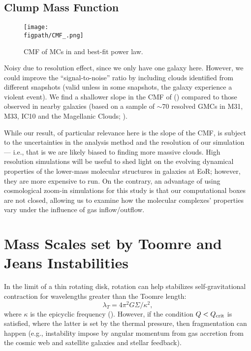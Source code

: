 \documentclass[apj]{emulateapj} %
\begin{document}
\subsection{Clump Mass Function}

\begin{figure*}[htbp]
\centering
\texttt{[image: \\figpath/CMF\_.png]}  
\caption{
CMF of MCs in \flower and best-fit power law.
\label{fig:cmf}}
\end{figure*}

Noisy due to resolution effect, since we only have one galaxy here. However, 
we could improve the ``signal-to-noise'' ratio by including clouds identified from different 
snapshots (valid unless in some snapshots, the galaxy experience a violent event).
We find a shallower slope in the CMF of \flower () 
compared to those observed in nearby galaxies (based on a sample of 
$\sim$70 resolved GMCs in M31, M33, IC10 and the Magellanic Clouds; \citealt{Blitz07a}).

While our result, of particular relevance here is the slope of the CMF, is subject 
to the uncertainties in the analysis method and the resolution of our simulation --- i.e., that is 
we are likely biased to finding more massive clouds.
High resolution simulations will be useful to shed light on 
the evolving dynamical properties of the lower-mass molecular structures in 
galaxies at EoR; however, they are more expensive to run.
On the contrary, an advantage of using cosmological zoom-in simulations for this study
is that our computational boxes are not closed, allowing us to examine how 
the molecular complexes' properties vary under the influence of gas inflow/outflow.


\section{Mass Scales set by Toomre and Jeans Instabilities}

In the limit of a thin rotating disk, rotation can help stabilizes self-gravitational contraction for wavelengths greater than the Toomre length:
\begin{equation}
\lambda_T = 4\pi^2 G\Sigma/\kappa^2,
\end{equation} 
where $\kappa$ is the epicyclic frequency (\citealt{Toomre64a}).
However, if the condition $Q<Q_{\rm crit}$ is satisfied, where the latter is set by 
the thermal pressure, then fragmentation can happen 
(e.g., instability impose by angular momentum from gas accretion from the cosmic web and 
satellite galaxies and stellar feedback).
\end{document}
